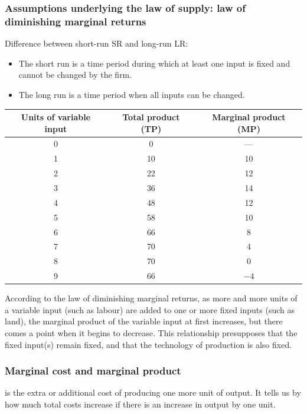 \subsubsection*{Assumptions underlying the law of supply: law of diminishing marginal returns}
Difference between short-run SR and long-run LR:
\begin{itemize}
  \item The short run is a time period during which at least one input is fixed and cannot be changed by the firm.
  \item The long run is a time period when all inputs can be changed.
\end{itemize}

\begin{center}
\begin{tabular}{ccc}
\toprule
\textbf{Units of variable input} & \textbf{Total product (TP)} & \textbf{Marginal product (MP)} \\
\midrule
0 & 0 & --- \\
1 & 10 & 10 \\
2 & 22 & 12 \\
3 & 36 & 14 \\
4 & 48 & 12 \\
5 & 58 & 10 \\
6 & 66 & 8 \\
7 & 70 & 4 \\
8 & 70 & 0 \\
9 & 66 & $-4$ \\
\bottomrule
\end{tabular}
\end{center}
According to the law of diminishing marginal returns, as more and more units of a variable input (such as labour) are added to one or more fixed inputs (such as land), the marginal product of the variable input at first increases, but there comes a point when it begins to decrease.
This relationship presupposes that the fixed input(s) remain fixed, and that the technology of production is also fixed.
\subsubsection*{Marginal cost and marginal product}
 is the extra or additional cost of producing one more unit of output. It tells us by how much total costs increase if there is an increase in output by one unit.

